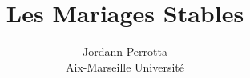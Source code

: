 
\title{Les Mariages Stables}
\author{
        Jordann Perrotta \\
      Aix-Marseille Universit\'e\\
}

